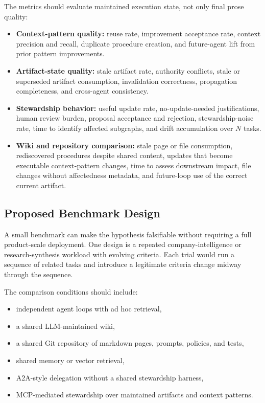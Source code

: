 \documentclass{article}
\begin{document}
The metrics should evaluate maintained execution state, not only final prose quality:
\begin{itemize}[leftmargin=*]
\item \textbf{Context-pattern quality:} reuse rate, improvement acceptance rate, context precision and recall, duplicate procedure creation, and future-agent lift from prior pattern improvements.
\item \textbf{Artifact-state quality:} stale artifact rate, authority conflicts, stale or superseded artifact consumption, invalidation correctness, propagation completeness, and cross-agent consistency.
\item \textbf{Stewardship behavior:} useful update rate, no-update-needed justifications, human review burden, proposal acceptance and rejection, stewardship-noise rate, time to identify affected subgraphs, and drift accumulation over $N$ tasks.
\item \textbf{Wiki and repository comparison:} stale page or file consumption, rediscovered procedures despite shared content, updates that become executable context-pattern changes, time to assess downstream impact, file changes without affectedness metadata, and future-loop use of the correct current artifact.
\end{itemize}

\subsection{Proposed Benchmark Design}

A small benchmark can make the hypothesis falsifiable without requiring a full product-scale deployment. One design is a repeated company-intelligence or research-synthesis workload with evolving criteria. Each trial would run a sequence of related tasks and introduce a legitimate criteria change midway through the sequence.

The comparison conditions should include:
\begin{itemize}[leftmargin=*]
\item independent agent loops with ad hoc retrieval,
\item a shared LLM-maintained wiki,
\item a shared Git repository of markdown pages, prompts, policies, and tests,
\item shared memory or vector retrieval,
\item A2A-style delegation without a shared stewardship harness,
\item MCP-mediated stewardship over maintained artifacts and context patterns.
\end{itemize}
\end{document}
